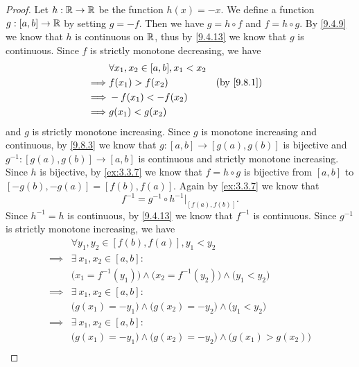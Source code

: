 \begin{proof}
  Let \(h : \mathbb{R} \to \mathbb{R}\) be the function \(h(x) = -x\).
  We define a function \(g : [a, b] \to \mathbb{R}\) by setting \(g = -f\).
  Then we have \(g = h \circ f\) and \(f = h \circ g\).
  By \cref{9.4.9} we know that \(h\) is continuous on \(\mathbb{R}\), thus by \cref{9.4.13} we know that \(g\) is continuous.
  Since \(f\) is strictly monotone decreasing, we have
  \begin{align*}
             & \forall x_1, x_2 \in [a, b], x_1 < x_2                 \\
    \implies & f(x_1) > f(x_2)                        &  & \by{9.8.1} \\
    \implies & -f(x_1) < -f(x_2)                                      \\
    \implies & g(x_1) < g(x_2)
  \end{align*}
  and \(g\) is strictly monotone increasing.
  Since \(g\) is monotone increasing and continuous, by \cref{9.8.3} we know that \(g : [a, b] \to [g(a), g(b)]\) is bijective and \(g^{-1} : [g(a), g(b)] \to [a, b]\) is continuous and strictly monotone increasing.
  Since \(h\) is bijective, by \cref{ex:3.3.7} we know that \(f = h \circ g\) is bijective from \([a, b]\) to \([-g(b), -g(a)] = [f(b), f(a)]\).
  Again by \cref{ex:3.3.7} we know that
  \[
    f^{-1} = g^{-1} \circ h^{-1}|_{[f(a), f(b)]}.
  \]
  Since \(h^{-1} = h\) is continuous, by \cref{9.4.13} we know that \(f^{-1}\) is continuous.
  Since \(g^{-1}\) is strictly monotone increasing, we have
  \begin{align*}
             & \forall y_1, y_2 \in [f(b), f(a)], y_1 < y_2                                                            \\
    \implies & \exists\ x_1, x_2 \in [a, b] :                                                                          \\
             & \big(x_1 = f^{-1}(y_1)\big) \land \big(x_2 = f^{-1}(y_2)\big) \land \big(y_1 < y_2\big)                 \\
    \implies & \exists\ x_1, x_2 \in [a, b] :                                                                          \\
             & \big(g(x_1) = -y_1\big) \land \big(g(x_2) = -y_2\big) \land \big(y_1 < y_2\big)                         \\
    \implies & \exists\ x_1, x_2 \in [a, b] :                                                                          \\
             & \big(g(x_1) = -y_1\big) \land \big(g(x_2) = -y_2\big) \land \big(g(x_1) > g(x_2)\big)                   \\

\end{align*}
\end{proof}
